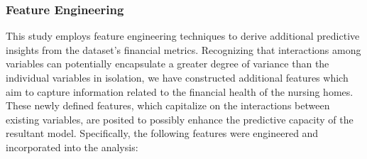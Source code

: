 \documentclass{article}
\theoremstyle{mytheoremstyle}
\theoremstyle{mytheoremstyle}
\theoremstyle{myproblemstyle}
\begin{document}
\subsubsection{Feature Engineering}
This study employs feature engineering techniques to derive additional predictive insights from the dataset's financial metrics. Recognizing that interactions among variables can potentially encapsulate a greater degree of variance than the individual variables in isolation, we have constructed additional features which aim to capture information related to the financial health of the nursing homes. These newly defined features, which capitalize on the interactions between existing variables, are posited to possibly enhance the predictive capacity of the resultant model. Specifically, the following features were engineered and incorporated into the analysis:
\end{document}
